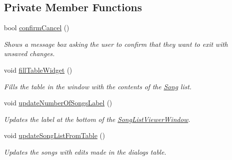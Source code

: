 \subsection*{Private Member Functions}
\begin{DoxyCompactItemize}
\item 
bool \mbox{\hyperlink{class_song_list_viewer_window_a7ed91cc8081f236e051a7255af708b79}{confirm\+Cancel}} ()
\begin{DoxyCompactList}\small\item\em Shows a message box asking the user to confirm that they want to exit with unsaved changes. \end{DoxyCompactList}\item 
void \mbox{\hyperlink{class_song_list_viewer_window_a5c13d4e89240659b95eb4b70ddc7f37d}{fill\+Table\+Widget}} ()
\begin{DoxyCompactList}\small\item\em Fills the table in the window with the contents of the \mbox{\hyperlink{class_song}{Song}} list. \end{DoxyCompactList}\item 
void \mbox{\hyperlink{class_song_list_viewer_window_a6e956b2dc5372636eeeefbcb9e52c351}{update\+Number\+Of\+Songs\+Label}} ()
\begin{DoxyCompactList}\small\item\em Updates the label at the bottom of the \mbox{\hyperlink{class_song_list_viewer_window}{Song\+List\+Viewer\+Window}}. \end{DoxyCompactList}\item 
void \mbox{\hyperlink{class_song_list_viewer_window_ad53bcfcb56d146d8ab1d9f91696b143f}{update\+Song\+List\+From\+Table}} ()
\begin{DoxyCompactList}\small\item\em Updates the songs with edits made in the dialog\textquotesingle{}s table. \end{DoxyCompactList}\end{DoxyCompactItemize}
